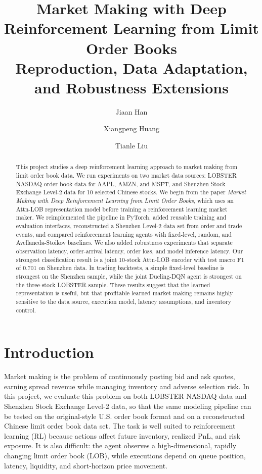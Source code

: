 \documentclass[11pt]{article}
\title{\textbf{Market Making with Deep Reinforcement Learning from Limit Order Books}\\
\large Reproduction, Data Adaptation, and Robustness Extensions}
\author{Jiaan Han \and Xiangpeng Huang \and Tianle Liu}
\date{}
\begin{document}
\maketitle

\begin{abstract}
This project studies a deep reinforcement learning approach to market making from
limit order book data. We run experiments on two market data sources: LOBSTER
NASDAQ order book data for AAPL, AMZN, and MSFT, and Shenzhen Stock Exchange
Level-2 data for 10 selected Chinese stocks. We begin from the paper
\emph{Market Making with Deep Reinforcement Learning from Limit Order Books},
which uses an Attn-LOB representation model before training a reinforcement
learning market maker. We reimplemented the pipeline in PyTorch, added reusable
training and evaluation interfaces, reconstructed a Shenzhen Level-2 data set
from order and trade events, and compared reinforcement learning agents with
fixed-level, random, and Avellaneda-Stoikov baselines. We also added robustness
experiments that separate observation latency, order-arrival latency, order
loss, and model inference latency. Our strongest classification result is a
joint 10-stock Attn-LOB encoder with test macro F1 of 0.701 on Shenzhen data. In
trading backtests, a simple fixed-level baseline is strongest on the Shenzhen
sample, while the joint Dueling-DQN agent is strongest on the three-stock
LOBSTER sample. These results suggest that the learned representation is useful,
but that profitable learned market making remains highly sensitive to the data
source, execution model, latency assumptions, and inventory control.
\end{abstract}

\section{Introduction}

Market making is the problem of continuously posting bid and ask quotes, earning
spread revenue while managing inventory and adverse selection risk. In this
project, we evaluate this problem on both LOBSTER NASDAQ data and Shenzhen Stock
Exchange Level-2 data, so that the same modeling pipeline can be tested on the
original-style U.S. order book format and on a reconstructed Chinese limit order
book data set. The task is well suited to reinforcement learning (RL) because
actions affect future inventory, realized PnL, and risk exposure. It is also
difficult: the agent observes a high-dimensional, rapidly changing limit order
book (LOB), while executions depend on queue position, latency, liquidity, and
short-horizon price movement.
\end{document}
